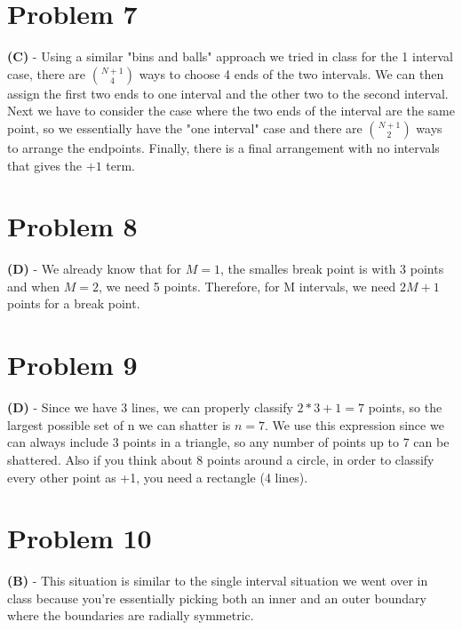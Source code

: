 \documentclass[10pt,letter]{article}
\begin{document}
\section*{Problem 7}

\textbf{(C)} - Using a similar "bins and balls" approach we tried in class for the 1 interval case, there are ${N+1}\choose{4}$ ways to choose 4 ends of the two intervals. We can then assign the first two ends to one interval and the other two to the second interval. Next we have to consider the case where the two ends of the interval are the same point, so we essentially have the "one interval" case and there are ${N+1}\choose{2}$ ways to arrange the endpoints. Finally, there is a final arrangement with no intervals that gives the $+ 1$ term.

\section*{Problem 8}

\textbf{(D)} - We already know that for $M = 1$, the smalles break point is with 3 points and when $M = 2$, we need 5 points. Therefore, for M intervals, we need $2M + 1$ points for a break point.

\section*{Problem 9}

\textbf{(D)} - Since we have 3 lines, we can properly classify $2*3+1 = 7$ points, so the largest possible set of n we can shatter is $n = 7$. We use this expression since we can always include 3 points in a triangle, so any number of points up to 7 can be shattered. Also if you think about 8 points around a circle, in order to classify every other point as +1, you need a rectangle (4 lines).

\section*{Problem 10}

\textbf{(B)} - This situation is similar to the single interval situation we went over in class because you're essentially picking both an inner and an outer boundary where the boundaries are radially symmetric.
\end{document}
